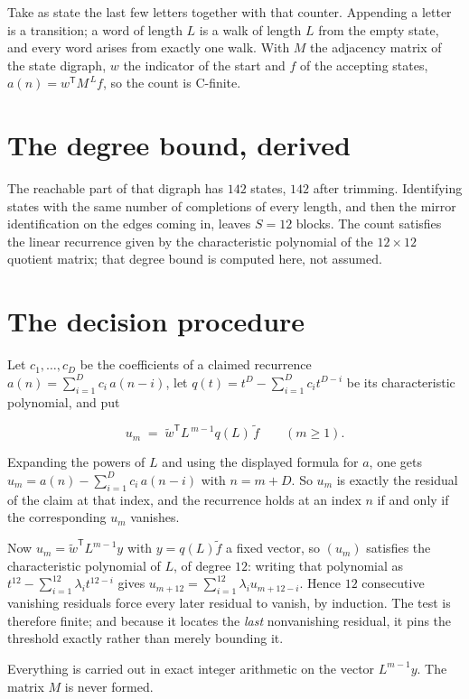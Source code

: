 \documentclass[11pt]{article}
\theoremstyle{definition}
\begin{document}
Take as state the last few letters together with that counter. Appending a letter is a transition; a word of length $L$ is a walk of length $L$ from the empty state, and every word arises from exactly one walk. With $M$ the adjacency matrix of the state digraph, $w$ the indicator of the start and $f$ of the accepting states, $a(n) = w^{\mathsf T}M^{\,L}f$, so the count is C-finite.

\section{The degree bound, derived}

The reachable part of that digraph has $142$ states, $142$ after trimming. Identifying states with the same number of completions of every length, and then the mirror identification on the edges coming in, leaves $S = 12$ blocks. The count satisfies the linear recurrence given by the characteristic polynomial of the $12\times12$ quotient matrix; that degree bound is computed here, not assumed.

\section{The decision procedure}

Let $c_1,\dots,c_D$ be the coefficients of a claimed recurrence $a(n) = \sum_{i=1}^{D} c_i\,a(n-i)$, let $q(t) = t^{D} - \sum_{i=1}^{D} c_i t^{D-i}$ be its characteristic polynomial, and put

\[u_m \;=\; \tilde w^{\mathsf T} L^{\,m-1} q(L)\,\tilde f \qquad (m \ge 1).\]

Expanding the powers of $L$ and using the displayed formula for $a$, one gets $u_m = a(n) - \sum_{i=1}^{D} c_i\,a(n-i)$ with $n = m + D$. So $u_m$ is exactly the residual of the claim at that index, and the recurrence holds at an index $n$ if and only if the corresponding $u_m$ vanishes.

Now $u_m = \tilde w^{\mathsf T} L^{m-1} y$ with $y = q(L)\tilde f$ a fixed vector, so $(u_m)$ satisfies the characteristic polynomial of $L$, of degree $12$: writing that polynomial as $t^{12} - \sum_{i=1}^{12} \lambda_i t^{12-i}$ gives $u_{m+12} = \sum_{i=1}^{12} \lambda_i u_{m+12-i}$. Hence $12$ consecutive vanishing residuals force every later residual to vanish, by induction. The test is therefore finite; and because it locates the {\itshape last} nonvanishing residual, it pins the threshold exactly rather than merely bounding it.

Everything is carried out in exact integer arithmetic on the vector $L^{m-1}y$. The matrix $M$ is never formed.
\end{document}
